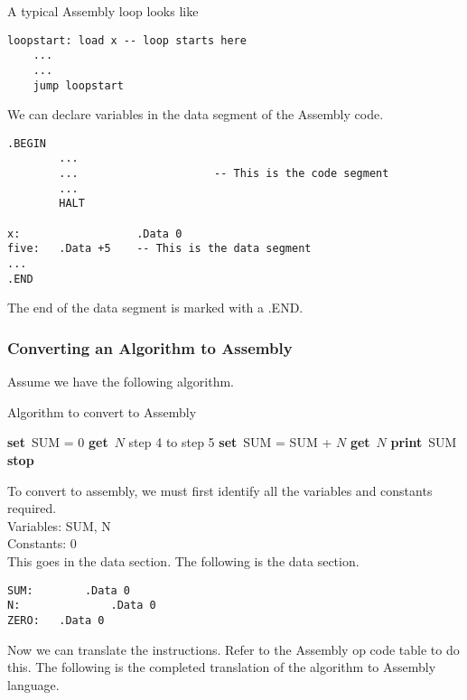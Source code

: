 \documentclass[]{article}
\newcommand{\Get}{\State \textbf{get}~}
\newcommand{\Set}{\State \textbf{set}~}
\newcommand{\Print}{\State \textbf{print}~}
\newcommand{\Stop}{\State \textbf{stop}~}
\begin{document}
A typical Assembly loop looks like

\begin{lstlisting}[style=customasm]
loopstart: load x -- loop starts here
	...
	...
	jump loopstart
\end{lstlisting}\bigbreak

We can declare variables in the data segment of the Assembly code.

\begin{lstlisting}[style=customasm]
.BEGIN
		...
		... 					-- This is the code segment
		...
		HALT
	
x:   				.Data 0
five: 	.Data +5 	-- This is the data segment
...
.END
\end{lstlisting}\bigbreak

The end of the data segment is marked with a .END.\\

\subsubsection{Converting an Algorithm to Assembly}
\bigbreak

Assume we have the following algorithm.

\begin{algorithm}
	\caption{Algorithm to convert to Assembly}
	\begin{algorithmic}[1]
		\Set SUM = 0
		\Get $N$ 
		 step 4 to step 5
		\Set SUM = SUM + $N$
		\Get $N$
		\EndWhile
		\Print SUM
		\Stop
	\end{algorithmic}
\end{algorithm}

To convert to assembly, we must first identify all the variables and constants required.\\

Variables: SUM, N\\
Constants: 0\\

This goes in the data section. The following is the data section.

\begin{lstlisting}[style=customasm]
SUM:		.Data 0
N:   			.Data 0
ZERO:	.Data 0
\end{lstlisting}\bigbreak

Now we can translate the instructions. Refer to the Assembly op code table to do this. The following is the completed translation of the algorithm to Assembly language.\\
\end{document}
